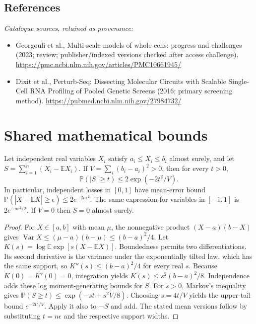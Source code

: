 \documentclass[11pt]{article}
\begin{document}
\subsection{References}
\noindent\emph{Catalogue sources, retained as provenance:}
\begin{itemize}
\item Georgouli et al., Multi-scale models of whole cells: progress and challenges (2023; review; publisher/indexed versions checked after access challenge). \url{https://pmc.ncbi.nlm.nih.gov/articles/PMC10661945/}
\item Dixit et al., Perturb-Seq: Dissecting Molecular Circuits with Scalable Single-Cell RNA Profiling of Pooled Genetic Screens (2016; primary screening method). \url{https://pubmed.ncbi.nlm.nih.gov/27984732/}
\end{itemize}




\section{Shared mathematical bounds}\label{app:bounds}
\begin{lemma}\label{lem:bounded}
Let independent real variables $X_i$ satisfy $a_i\leq X_i\leq b_i$ almost surely,
and let $S=\sum_{i=1}^n(X_i-\mathbb{E} X_i)$. If
$V=\sum_i(b_i-a_i)^2>0$, then for every $t>0$,
\[
 \mathbb{P}(|S|\geq t)\leq 2\exp(-2t^2/V).
\]
In particular, independent losses in $[0,1]$ have mean-error bound
$\mathbb{P}(|\overline X-\mathbb{E}\overline X|\geq\epsilon)
\leq2e^{-2n\epsilon^2}$. The same expression for variables in $[-1,1]$
is $2e^{-n\epsilon^2/2}$. If $V=0$ then $S=0$ almost surely.
\end{lemma}
\begin{proof}
For $X\in[a,b]$ with mean $\mu$, the nonnegative product
$(X-a)(b-X)$ gives
$\operatorname{Var} X\leq(\mu-a)(b-\mu)\leq(b-a)^2/4$.
Let $K(s)=\log\mathbb{E}\exp[s(X-\mathbb{E} X)]$.
Boundedness permits two differentiations. Its second derivative is the variance
under the exponentially tilted law, which has the same support, so
$K''(s)\leq(b-a)^2/4$ for every real $s$.
Because $K(0)=K'(0)=0$, integration yields
$K(s)\leq s^2(b-a)^2/8$.
Independence adds these log moment-generating bounds for $S$.
For $s>0$, Markov's inequality gives
$\mathbb{P}(S\geq t)\leq\exp(-st+s^2V/8)$.
Choosing $s=4t/V$ yields the upper-tail bound $e^{-2t^2/V}$.
Apply it also to $-S$ and add. The stated mean versions follow by substituting
$t=n\epsilon$ and the respective support widths.
\end{proof}
\end{document}
